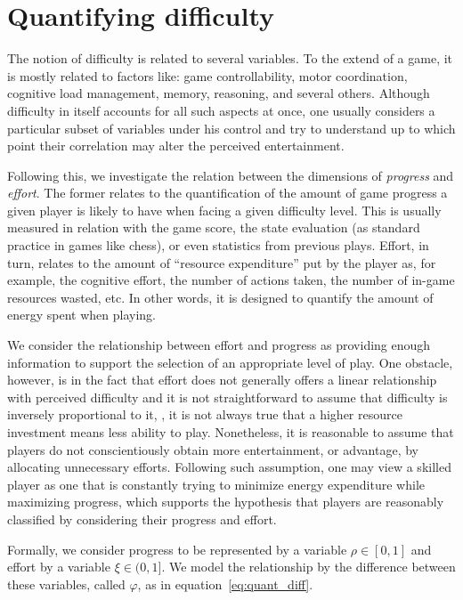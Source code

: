 \section{Quantifying difficulty}
The notion of difficulty is related to several variables. To the extend of a game, it is mostly related to factors like: game controllability, motor coordination, cognitive load management, memory, reasoning, and several others. Although difficulty in itself accounts for all such aspects at once, one usually considers a particular subset of variables under his control and try to understand up to which point their correlation may alter the perceived entertainment.

Following this, we investigate the relation between the dimensions of \textit{progress} and \textit{effort}. The former relates to the quantification of the amount of game progress a given player is likely to have when facing a given difficulty level. This is usually measured in relation with the game score, the state evaluation (as standard practice in games like chess), or even statistics from previous plays. Effort, in turn, relates to the amount of ``resource expenditure'' put by the player as, for example, the cognitive effort, the number of actions taken, the number of in-game resources wasted, etc. In other words, it is designed to quantify the amount of energy spent when playing.

We consider the relationship between effort and progress as providing enough information to support the selection of an appropriate level of play. One obstacle, however, is in the fact that effort does not generally offers a linear relationship with perceived difficulty and it is not straightforward to assume that difficulty is inversely proportional to it, \ie, it is not always true that a higher resource investment means less ability to play. 
Nonetheless, it is reasonable to assume that players do not conscientiously obtain more entertainment, or advantage, by allocating unnecessary efforts. Following such assumption, one may view a skilled player as one that is constantly trying to minimize energy expenditure while maximizing progress, which supports the hypothesis that players are reasonably classified by considering their progress and effort.

Formally, we consider progress to be represented by a variable $\rho \in [0, 1]$ and effort by a variable $\xi \in (0, 1]$. We model the relationship by the difference between these variables, called $\varphi$, as in equation~\ref{eq:quant_diff}.


